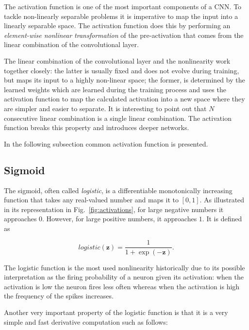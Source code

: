 The activation function is one of the most important components of a CNN. To tackle non-linearly separable problems it is imperative to map the input into a linearly separable space. The activation function does this by performing an \emph{element-wise nonlinear transformation} of the pre-activation that comes from the linear combination of the convolutional layer.

The linear combination of the convolutional layer and the nonlinearity work together closely: the latter is usually fixed and does not evolve during training, but maps its input to a highly non-linear space; the former, is determined by the learned weights which are learned during the training process and uses the activation function to map the calculated activation into a new space where they are simpler and easier to separate. It is interesting to point out that $N$ consecutive linear combination is a single linear combination. The activation function breaks this property and introduces deeper networks.

In the following subsection common activation function is presented.

\subsection{Sigmoid}\label{sec:logistic}
The sigmoid, often called \emph{logistic}, is a differentiable monotonically
increasing function that takes any real-valued number and maps it to $[0, 1]$.
As illustrated in its representation in Fig.~\ref{fig:activations}, for large
negative numbers it approaches $0$. However, for large positive numbers, it
approaches $1$. It is defined as

\begin{equation}\label{eq:logistic}
    logistic(\mathbf{z}) = \frac{1}{1+\exp(-\mathbf{z})}.
\end{equation}

\noindent The logistic function is the most used nonlinearity historically due to its possible interpretation as the firing probability of a neuron given its activation: when the activation is low the neuron fires less often whereas when the activation is high the frequency of the spikes increases.

Another very important property of the logistic function is that it is a very
simple and fast derivative computation such as follows:

